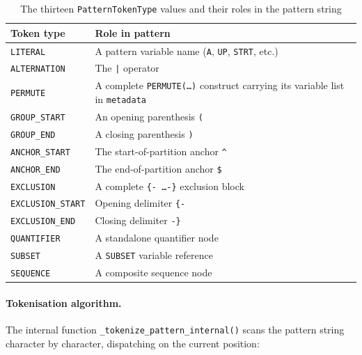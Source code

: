 \begin{table}[htbp]
  \centering
  \caption{The thirteen \texttt{PatternTokenType} values and their
    roles in the pattern string}
  \label{tab:token-types}
  \begin{tabular}{lp{8cm}}
    \toprule
    \textbf{Token type}         & \textbf{Role in pattern} \\
    \midrule
    \texttt{LITERAL}            & A pattern variable name (\texttt{A}, \texttt{UP},
                                  \texttt{STRT}, etc.) \\
    \texttt{ALTERNATION}        & The \texttt{|} operator \\
    \texttt{PERMUTE}            & A complete \texttt{PERMUTE(\ldots)} construct
                                  carrying its variable list in \texttt{metadata} \\
    \texttt{GROUP\_START}       & An opening parenthesis \texttt{(} \\
    \texttt{GROUP\_END}         & A closing parenthesis \texttt{)} \\
    \texttt{ANCHOR\_START}      & The start-of-partition anchor \texttt{\^{}} \\
    \texttt{ANCHOR\_END}        & The end-of-partition anchor \texttt{\$} \\
    \texttt{EXCLUSION}          & A complete \texttt{\{- \ldots -\}} exclusion block \\
    \texttt{EXCLUSION\_START}   & Opening delimiter \texttt{\{-} \\
    \texttt{EXCLUSION\_END}     & Closing delimiter \texttt{-\}} \\
    \texttt{QUANTIFIER}         & A standalone quantifier node \\
    \texttt{SUBSET}             & A \texttt{SUBSET} variable reference \\
    \texttt{SEQUENCE}           & A composite sequence node \\
    \bottomrule
  \end{tabular}
\end{table}

\paragraph{Tokenisation algorithm.}
The internal function \texttt{\_tokenize\_pattern\_internal()} scans
the pattern string character by character, dispatching on the current
position:

